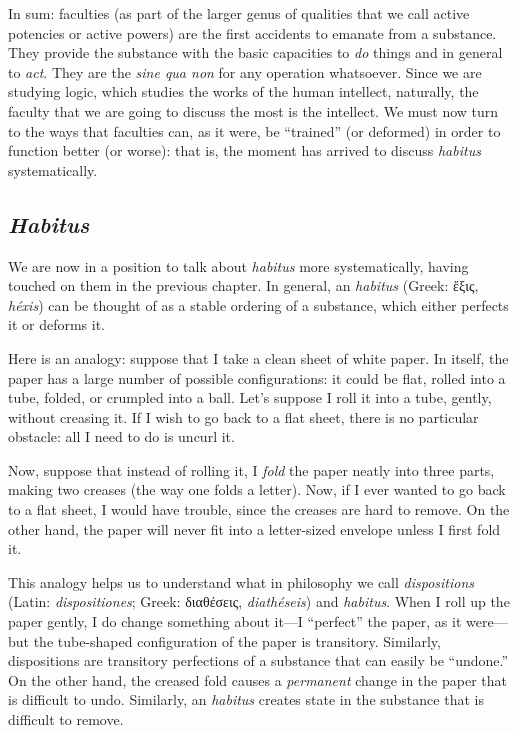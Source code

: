 \documentclass[article,12pt,a4paper,oneside]{memoir}
\begin{document}
    In sum: faculties (as part of the larger genus of qualities that we
    call active potencies or active powers) are the first accidents to
    emanate from a substance. They provide the substance with the basic
    capacities to \emph{do} things and in general to \emph{act}. They
    are the \emph{sine qua non} for any operation whatsoever. Since we
    are studying logic, which studies the works of the human intellect,
    naturally, the faculty that we are going to discuss the most is the
    intellect. We must now turn to the ways that faculties can, as it
    were, be ``trained'' (or deformed) in order to function better (or
    worse): that is, the moment has arrived to discuss \emph{habitus}
    systematically.

    \hypertarget{habitus}{%
    \subsection{\texorpdfstring{\emph{Habitus}}{Habitus}}\label{habitus}}

    We are now in a position to talk about \emph{habitus} more
    systematically, having touched on them in the previous chapter. In
    general, an \emph{habitus} (Greek: ἕξις, \emph{héxis}) can be
    thought of as a stable ordering of a substance, which either
    perfects it or deforms it.

    Here is an analogy: suppose that I take a clean sheet of white
    paper. In itself, the paper has a large number of possible
    configurations: it could be flat, rolled into a tube, folded, or
    crumpled into a ball. Let's suppose I roll it into a tube, gently,
    without creasing it. If I wish to go back to a flat sheet, there is
    no particular obstacle: all I need to do is uncurl it.

    Now, suppose that instead of rolling it, I \emph{fold} the paper
    neatly into three parts, making two creases (the way one folds a
    letter). Now, if I ever wanted to go back to a flat sheet, I would
    have trouble, since the creases are hard to remove. On the other
    hand, the paper will never fit into a letter-sized envelope unless I
    first fold it.

    This analogy helps us to understand what in philosophy we call
    \emph{dispositions} (Latin: \emph{dispositiones}; Greek: διαθέσεις,
    \emph{diathéseis}) and \emph{habitus}. When I roll up the paper
    gently, I do change something about it---I ``perfect'' the paper, as
    it were---but the tube-shaped configuration of the paper is
    transitory. Similarly, dispositions are transitory perfections of a
    substance that can easily be ``undone.'' On the other hand, the
    creased fold causes a \emph{permanent} change in the paper that is
    difficult to undo. Similarly, an \emph{habitus} creates state in the
    substance that is difficult to remove.
\end{document}
